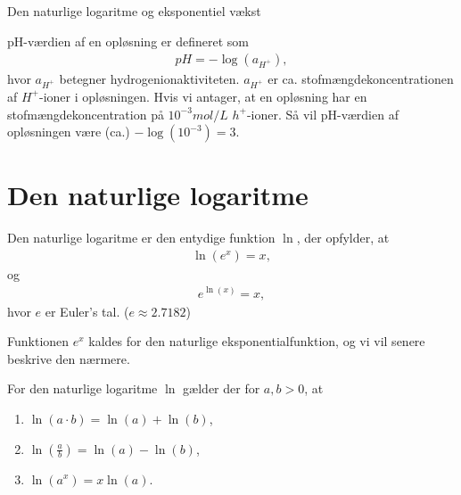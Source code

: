 \begin{center}
\Huge
Den naturlige logaritme og eksponentiel vækst
\end{center}
\begin{exa}
pH-værdien af en opløsning er defineret som
\begin{align*}
pH = -\log(a_{H^+}),
\end{align*}
hvor $a_{H^+}$ betegner hydrogenionaktiviteten. $a_{H^{+}}$ er ca. stofmængdekoncentrationen af $H^{+}$-ioner i opløsningen. Hvis vi antager, at en opløsning har en stofmængdekoncentration på $10^{-3}mol/L$ $h^+$-ioner. Så vil 
pH-værdien af opløsningen være (ca.) $-\log(10^{-3}) = 3$.  
\end{exa}
\section*{Den naturlige logaritme}
\begin{defn}
Den naturlige logaritme er den entydige funktion $\ln$, der opfylder, at
\begin{align*}
\ln(e^x) = x, 
\end{align*}
og
\begin{align*}
e^{\ln(x)} = x,
\end{align*}
hvor $e$ er Euler's tal. ($e \approx 2.7182$)
\end{defn}
Funktionen $e^x$ kaldes for den naturlige eksponentialfunktion, og vi vil senere beskrive den nærmere.

\begin{setn}
For den naturlige logaritme $\ln$ gælder der for $a,b>0$, at
\begin{enumerate}[label=\roman*)]
\item $\ln(a\cdot b) = \ln(a) + \ln(b)$,
\item $\ln(\frac{a}{b}) = \ln(a)-\ln(b)$,
\item $\ln(a^x) = x\ln(a)$.
\end{enumerate}
\end{setn}

